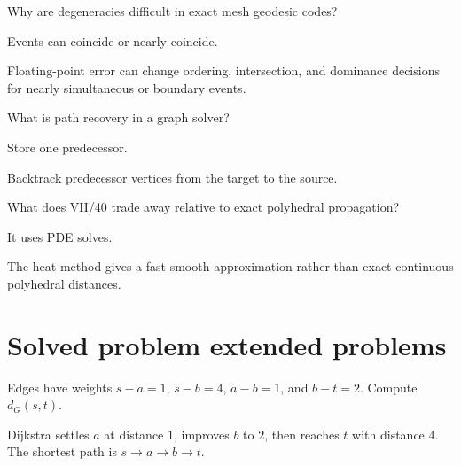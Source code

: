 \begin{exercise}\label{exr:vii39-22}
Why are degeneracies difficult in exact mesh geodesic codes?
\end{exercise}

\begin{hint}
Events can coincide or nearly coincide.
\end{hint}

\begin{solution}
Floating-point error can change ordering, intersection, and dominance decisions for nearly simultaneous or boundary events.
\end{solution}

\begin{exercise}\label{exr:vii39-23}
What is path recovery in a graph solver?
\end{exercise}

\begin{hint}
Store one predecessor.
\end{hint}

\begin{solution}
Backtrack predecessor vertices from the target to the source.
\end{solution}

\begin{exercise}\label{exr:vii39-24}
What does VII/40 trade away relative to exact polyhedral propagation?
\end{exercise}

\begin{hint}
It uses PDE solves.
\end{hint}

\begin{solution}
The heat method gives a fast smooth approximation rather than exact continuous polyhedral distances.
\end{solution}

\section{Solved problem extended problems}

\begin{problem}\label{prob:vii39-01}
Edges have weights \(s\!-\!a=1\), \(s\!-\!b=4\), \(a\!-\!b=1\), and \(b\!-\!t=2\).  Compute \(d_G(s,t)\).
\end{problem}

\begin{solution}
Dijkstra settles \(a\) at distance \(1\), improves \(b\) to \(2\), then reaches \(t\) with distance \(4\).  The shortest path is \(s\to a\to b\to t\).
\end{solution}

